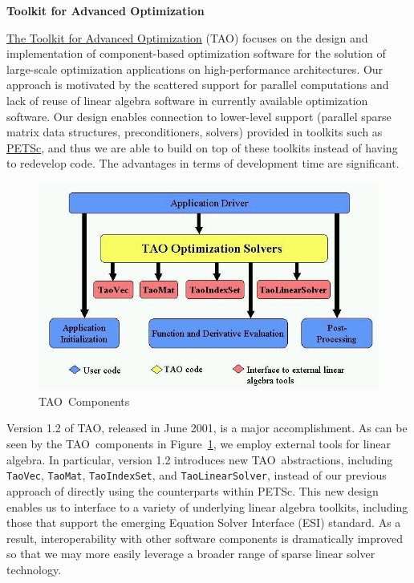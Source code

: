 \documentclass[11pt]{article}
\newcommand{\tao} {\mbox{\sf \footnotesize TAO}}
\begin{document}
\setlength{\baselineskip}{15pt}

\begin{center}
{\large
\textbf{Toolkit for Advanced Optimization}}
\end{center}

\href{https://www.mcs.anl.gov/research/projects/tao/}
{The Toolkit for Advanced Optimization} (\tao)
focuses on the design and implementation of
component-based optimization software for the
solution of large-scale optimization applications
on high-performance architectures.
Our approach is motivated by the
scattered support for parallel computations and
lack of reuse of linear algebra software in
currently available optimization software.
Our design enables connection to lower-level
support (parallel sparse matrix data
structures, preconditioners, solvers) provided in toolkits such as
\href{https://www.mcs.anl.gov/petsc}{PETSc},
and thus we are able to build on top of these toolkits
instead of having to redevelop code. The advantages in
terms of development time are significant.

\begin{figure}[h]
\centerline {\includegraphics[angle=-90,width = 5.8in]{tao_comps}}
\caption{\tao\ Components}
\label{figure:tao_comps}
\end{figure}

Version 1.2 of \tao, released in June 2001, is a major accomplishment.
As can be seen by the \tao\ components in
Figure~\ref{figure:tao_comps}, we employ external tools for linear
algebra.  In particular, version 1.2 introduces new \tao\
abstractions, including \texttt{TaoVec}, \texttt{TaoMat},
\texttt{TaoIndexSet}, and \texttt{TaoLinearSolver}, instead of our
previous approach of directly using the counterparts within PETSc.
This new design enables us to interface to a variety of underlying
linear algebra toolkits, including those that support the emerging
Equation Solver Interface (ESI) standard.  As a result,
interoperability with other software components is dramatically
improved so that we may more easily leverage a broader range of
sparse linear solver technology.
\end{document}
